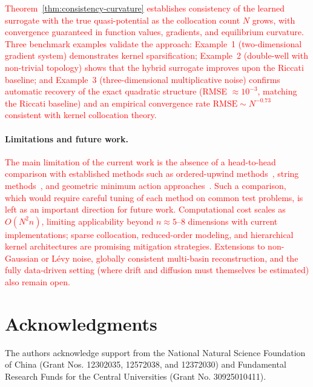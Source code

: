 \documentclass[11pt]{article}
\theoremstyle{plain}      %
\theoremstyle{definition} %
\begin{document}
\textcolor{red}{Theorem~\ref{thm:consistency-curvature} establishes consistency of the learned surrogate with the true quasi-potential as the collocation count $N$ grows, with convergence guaranteed in function values, gradients, and equilibrium curvature. Three benchmark examples validate the approach: Example~1 (two-dimensional gradient system) demonstrates kernel sparsification; Example~2 (double-well with non-trivial topology) shows that the hybrid surrogate improves upon the Riccati baseline; and Example~3 (three-dimensional multiplicative noise) confirms automatic recovery of the exact quadratic structure (RMSE $\approx 10^{-3}$, matching the Riccati baseline) and an empirical convergence rate $\text{RMSE}\sim N^{-0.73}$ consistent with kernel collocation theory.}

\paragraph{Limitations and future work.}
\textcolor{red}{The main limitation of the current work is the absence of a head-to-head comparison with established methods such as ordered-upwind methods~\cite{cameron2012finding, dahiya2018ordered}, string methods~\cite{heymann2008geometric, grafke2019numerical}, and geometric minimum action approaches~\cite{zhou2008adaptive}. Such a comparison, which would require careful tuning of each method on common test problems, is left as an important direction for future work.
Computational cost scales as $O(N^2 n)$, limiting applicability beyond $n\approx 5$--8 dimensions with current implementations; sparse collocation, reduced-order modeling, and hierarchical kernel architectures are promising mitigation strategies. Extensions to non-Gaussian or Lévy noise, globally consistent multi-basin reconstruction, and the fully data-driven setting (where drift and diffusion must themselves be estimated) also remain open.}

\section*{Acknowledgments}	
The authors acknowledge support from the National Natural Science Foundation of China (Grant Nos. 12302035, 12572038, and 12372030) and Fundamental Research Funds for the Central Universities (Grant No. 30925010411).



\end{document}
